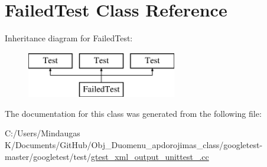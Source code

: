 \hypertarget{class_failed_test}{}\section{Failed\+Test Class Reference}
\label{class_failed_test}
Inheritance diagram for Failed\+Test\+:\begin{figure}[H]
\begin{center}
\leavevmode
\includegraphics[height=2.000000cm]{d2/de1/class_failed_test}
\end{center}
\end{figure}


The documentation for this class was generated from the following file\+:\begin{DoxyCompactItemize}
\item 
C\+:/\+Users/\+Mindaugas K/\+Documents/\+Git\+Hub/\+Obj\+\_\+\+Duomenu\+\_\+apdorojimas\+\_\+class/googletest-\/master/googletest/test/\mbox{\hyperlink{googletest-master_2googletest_2test_2gtest__xml__output__unittest___8cc}{gtest\+\_\+xml\+\_\+output\+\_\+unittest\+\_\+.\+cc}}\end{DoxyCompactItemize}
